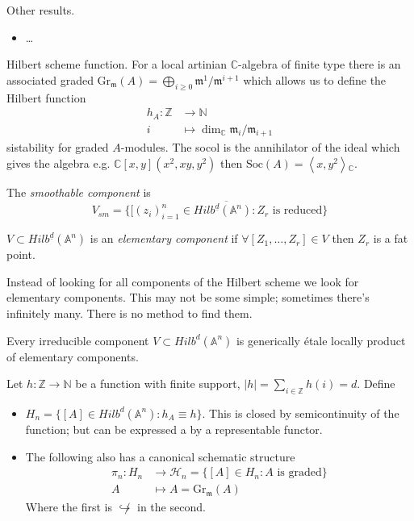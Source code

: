 Other results.
\begin{itemize}
\item …
\end{itemize}
Hilbert scheme function.
For a local artinian $\mathbb{C}$-algebra of
finite type there is an associated graded
$\text{Gr}_\mathfrak{m}(A)
=\bigoplus_{i \geq
0}\mathfrak{m}^1/\mathfrak{m}^{i+1}$
which allows us to define the Hilbert
function
$$
\begin{aligned}
h_A: \mathbb{Z} &\longrightarrow \mathbb{N}
\\
i &\longmapsto \dim_\mathbb{C}
\mathfrak{m}_i/\mathfrak{m}_{i+1}
\end{aligned}
$$
sistability for graded $A$-modules.
The socol is the annihilator of
the ideal which gives the algebra
e.g. $\mathbb{C}[x,y](x^2,xy,y^2)$ then
$\text{Soc}(A)=\left\langle{}x,y^2\right\rangle{}_\mathbb{C}
$.

\medskip\noindent
\begin{definition}
\label{definition-smoothable-component}
The {\it smoothable component} is
 $$
V_{sm}=\overline{\{[(z_i)_{i=1}^n \in
Hilb^{\underline{d}}(\mathbb{A}^n):
Z_r\text{ is reduced}\}}
$$
\end{definition}

\begin{definition}
\label{definition-elementary-componenet}
$V \subset
Hilb^{\underline{d}}(\mathbb{A}^n)$ is
an {\it elementary component} if
$\forall [Z_1,\ldots,Z_r] \in V$
then $Z_r$ is a fat point.
\end{definition}

Instead of looking for all components of the
Hilbert scheme
we look for elementary components. This may
not be some simple;
sometimes there's infinitely many. There
is no method to find them.

\begin{theorem}[Irrabaro]
\label{theorem-I}
Every irreducible component $V \subset
Hilb^d(\mathbb{A}^n)$
is generically étale locally product of
elementary components.
\end{theorem}

\begin{definition}
\label{definition-}
Let $h:\mathbb{Z} \to \mathbb{N}$ be a
function
with finite support, $|h|=\sum_{ i \in
\mathbb{Z}}h(i)=d$. Define
\begin{itemize}
\item $H_n=\{[A] \in Hilb^d(\mathbb{A}^n):
h_A \equiv h\}$.
This is closed by semicontinuity of the
function; but can be expressed
a by a representable functor.
\item The following also has a canonical
schematic structure
$$
\begin{aligned}
\pi_n:H_n  &\longrightarrow
\mathcal{H}_n=\{[A] \in H_n: A\text{ is
graded}\} \\
A &\longmapsto A=\text{Gr}_{\mathfrak{m}}(A)
\end{aligned}
$$
Where the first is $\not\hookrightarrow $ in
the second.
\end{itemize}
\end{definition}

